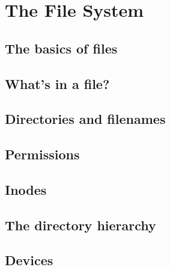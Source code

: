 \chapter{The File System}

\section{The basics of files}
\section{What's in a file?}
\section{Directories and filenames}
\section{Permissions}
\section{Inodes}
\section{The directory hierarchy}
\section{Devices}
